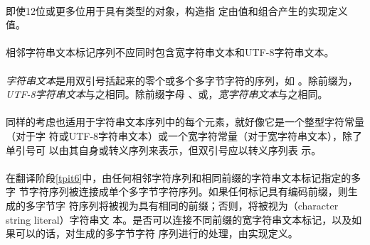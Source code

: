 {\paragraph{}
\ex 即使12位或更多位用于具有类型的对象，构造指
定由值和\tm{\sq 4\sq}组合产生的实现定义值。


\syntax
\paragraph{}

\constraint
\paragraph{}
相邻字符串文本标记序列不应同时包含宽字符串文本和UTF-8字符串文本。

\desc
\paragraph{}
\textit{字符串文本}是用双引号括起来的零个或多个多字节字符的序列，如
。除前缀为，\textit{UTF-8字符串文本}与之相同。除前缀字母
、或，\textit{宽字符串文本}与之相同。

\paragraph{}
同样的考虑也适用于字符串文本序列中的每个元素，就好像它是一个整型字符常量（对于字
符或UTF-8字符串文本）或一个宽字符常量（对于宽字符串文本），除了单引号\tm{\sq}可
以由其自身或转义序列\tm{\bs\sq}来表示，但双引号\tm{\dq}应以转义序列\tm{\bs\dq}表
示。

\semantic
\paragraph{}
在翻译阶段\ref{tpit6}中，由任何相邻字符序列和相同前缀的字符串文本标记指定的多字
节字符序列被连接成单个多字节字符序列。如果任何标记具有编码前缀，则生成的多字节字
符序列将被视为具有相同的前缀；否则，将被视为（character string literal）字符串文
本。是否可以连接不同前缀的宽字符串文本标记，以及如果可以的话，对生成的多字节字符
序列进行的处理，由实现定义。

}
